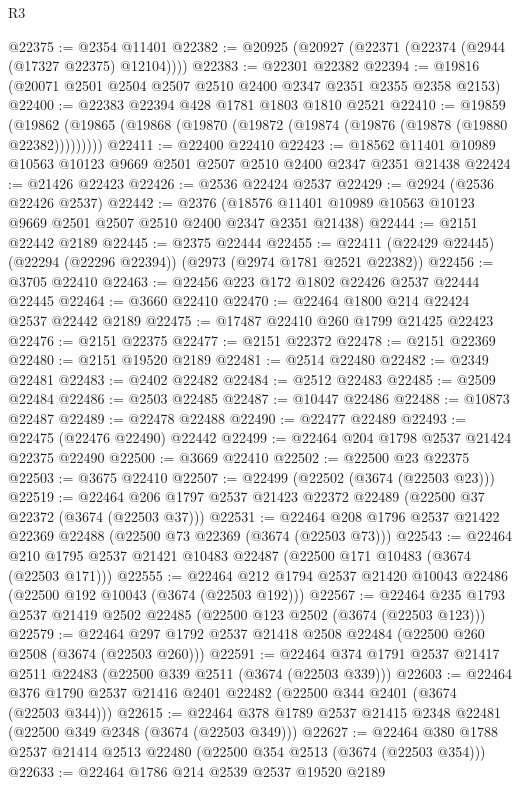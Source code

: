 \begin{lexlean}{R3}
\begin{coremodule}
@22375 := @2354 @11401
@22382 := @20925 (@20927 (@22371 (@22374 (@2944 (@17327 @22375) @12104))))
@22383 := @22301 @22382
@22394 := @19816 (@20071 @2501 @2504 @2507 @2510 @2400 @2347 @2351 @2355 @2358 @2153)
@22400 := @22383 @22394 @428 @1781 @1803 @1810 @2521
@22410 := @19859
    (@19862 (@19865 (@19868 (@19870 (@19872 (@19874 (@19876 (@19878 (@19880 @22382)))))))))
@22411 := @22400 @22410
@22423 := @18562 @11401 @10989 @10563 @10123 @9669 @2501 @2507 @2510 @2400 @2347 @2351 @21438
@22424 := @21426 @22423
@22426 := @2536 @22424 @2537
@22429 := @2924 (@2536 @22426 @2537)
@22442 := @2376
    (@18576 @11401 @10989 @10563 @10123 @9669 @2501 @2507 @2510 @2400 @2347 @2351 @21438)
@22444 := @2151 @22442 @2189
@22445 := @2375 @22444
@22455 := @22411 (@22429 @22445) (@22294 (@22296 @22394)) (@2973 (@2974 @1781 @2521 @22382))
@22456 := @3705 @22410
@22463 := @22456 @223 @172 @1802 @22426 @2537 @22444 @22445
@22464 := @3660 @22410
@22470 := @22464 @1800 @214 @22424 @2537 @22442 @2189
@22475 := @17487 @22410 @260 @1799 @21425 @22423
@22476 := @2151 @22375
@22477 := @2151 @22372
@22478 := @2151 @22369
@22480 := @2151 @19520 @2189
@22481 := @2514 @22480
@22482 := @2349 @22481
@22483 := @2402 @22482
@22484 := @2512 @22483
@22485 := @2509 @22484
@22486 := @2503 @22485
@22487 := @10447 @22486
@22488 := @10873 @22487
@22489 := @22478 @22488
@22490 := @22477 @22489
@22493 := @22475 (@22476 @22490) @22442
@22499 := @22464 @204 @1798 @2537 @21424 @22375 @22490
@22500 := @3669 @22410
@22502 := @22500 @23 @22375
@22503 := @3675 @22410
@22507 := @22499 (@22502 (@3674 (@22503 @23)))
@22519 := @22464 @206 @1797 @2537 @21423 @22372 @22489 (@22500 @37 @22372 (@3674 (@22503 @37)))
@22531 := @22464 @208 @1796 @2537 @21422 @22369 @22488 (@22500 @73 @22369 (@3674 (@22503 @73)))
@22543 := @22464 @210 @1795 @2537 @21421 @10483 @22487 (@22500 @171 @10483 (@3674 (@22503 @171)))
@22555 := @22464 @212 @1794 @2537 @21420 @10043 @22486 (@22500 @192 @10043 (@3674 (@22503 @192)))
@22567 := @22464 @235 @1793 @2537 @21419 @2502 @22485 (@22500 @123 @2502 (@3674 (@22503 @123)))
@22579 := @22464 @297 @1792 @2537 @21418 @2508 @22484 (@22500 @260 @2508 (@3674 (@22503 @260)))
@22591 := @22464 @374 @1791 @2537 @21417 @2511 @22483 (@22500 @339 @2511 (@3674 (@22503 @339)))
@22603 := @22464 @376 @1790 @2537 @21416 @2401 @22482 (@22500 @344 @2401 (@3674 (@22503 @344)))
@22615 := @22464 @378 @1789 @2537 @21415 @2348 @22481 (@22500 @349 @2348 (@3674 (@22503 @349)))
@22627 := @22464 @380 @1788 @2537 @21414 @2513 @22480 (@22500 @354 @2513 (@3674 (@22503 @354)))
@22633 := @22464 @1786 @214 @2539 @2537 @19520 @2189

\end{coremodule}
\end{lexlean}
